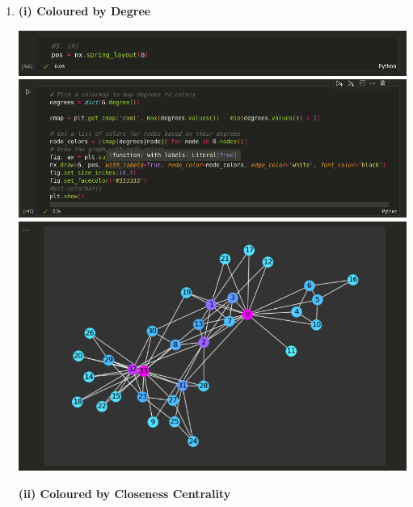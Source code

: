 \documentclass{article}
\begin{document}
\begin{enumerate}[label=(\alph*), left=10pt, itemsep=10pt]
        \item \begin{minipage}[t]{0.9\textwidth}
            \textbf{(i) Coloured by Degree}\\
            \begin{minipage}[t]{0.9\textwidth}
                \vspace{0.1em} %
                \centering
                \includegraphics[width=5.9in]{./5hi1.png}
                \includegraphics[width=5.9in]{./5hi2.png}
                \includegraphics[width=5.9in]{./5hi3.png}
            \end{minipage}
        \end{minipage}
        \newpage
        \begin{minipage}[t]{0.9\textwidth}
                \textbf{(ii) Coloured by Closeness Centrality}\\
                \begin{minipage}[t]{0.9\textwidth}
                    \vspace{0.1em} %

\end{minipage}
\end{minipage}
\end{enumerate}
\end{document}
